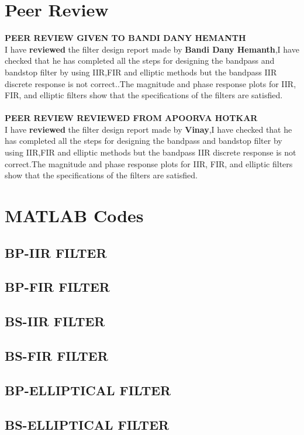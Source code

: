 \documentclass[12pt]{article}
\begin{document}
\section{\textbf{Peer Review}}
\textbf{PEER REVIEW GIVEN TO BANDI DANY HEMANTH}\\
I have \textbf{reviewed} the filter design report made by \textbf{Bandi Dany Hemanth},I have checked that he has completed all the steps for designing the bandpass and bandstop filter by using IIR,FIR and elliptic methods  but the bandpass IIR discrete response is not correct..The magnitude and phase response plots for IIR, FIR, and elliptic filters show that the specifications of the filters are satisfied.\\\\
\textbf{PEER REVIEW REVIEWED FROM APOORVA HOTKAR}\\ 
I have \textbf{reviewed} the filter design report made by \textbf{Vinay},I have checked that he has completed all the steps for designing the bandpass and bandstop filter by using IIR,FIR and elliptic methods but the bandpass IIR discrete response is not correct.The magnitude and phase response plots for IIR, FIR, and elliptic filters show that the specifications of the filters are satisfied.

\section{\textbf{MATLAB Codes}}
\subsection{BP-IIR FILTER}

\newpage
\subsection{BP-FIR FILTER}

\newpage
\subsection{BS-IIR FILTER}

\newpage
\subsection{BS-FIR FILTER}

\newpage
\subsection{BP-ELLIPTICAL FILTER}

\newpage
\subsection{BS-ELLIPTICAL FILTER}

\end{document}

